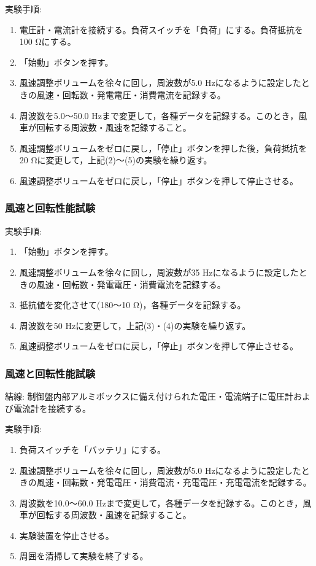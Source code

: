 \documentclass[a4paper,11pt,xelatex,ja=standard]{bxjsarticle}
\begin{document}
            実験手順:
            \begin{enumerate}
                \item 電圧計・電流計を接続する。負荷スイッチを「負荷」にする。負荷抵抗を100 Ωにする。
                \item 「始動」ボタンを押す。
                \item 風速調整ボリュームを徐々に回し，周波数が5.0 Hzになるように設定したときの風速・回転数・発電電圧・消費電流を記録する。
                \item 周波数を5.0～50.0 Hzまで変更して，各種データを記録する。このとき，風車が回転する周波数・風速を記録すること。
                \item 風速調整ボリュームをゼロに戻し，「停止」ボタンを押した後，負荷抵抗を20 Ωに変更して，上記(2)～(5)の実験を繰り返す。
                \item 風速調整ボリュームをゼロに戻し，「停止」ボタンを押して停止させる。
            \end{enumerate}
    
        \subsubsection{風速と回転性能試験}
            実験手順:
            \begin{enumerate}
                \item 「始動」ボタンを押す。
                \item 風速調整ボリュームを徐々に回し，周波数が35 Hzになるように設定したときの風速・回転数・発電電圧・消費電流を記録する。
                \item 抵抗値を変化させて(180～10 Ω)，各種データを記録する。
                \item 周波数を50 Hzに変更して，上記(3)・(4)の実験を繰り返す。
                \item 風速調整ボリュームをゼロに戻し，「停止」ボタンを押して停止させる。
            \end{enumerate}
    
        \subsubsection{風速と回転性能試験}
            結線: 制御盤内部アルミボックスに備え付けられた電圧・電流端子に電圧計および電流計を接続する。
    
            実験手順:
            \begin{enumerate}
                \item 負荷スイッチを「バッテリ」にする。
                \item 風速調整ボリュームを徐々に回し，周波数が5.0 Hzになるように設定したときの風速・回転数・発電電圧・消費電流・充電電圧・充電電流を記録する。
                \item 周波数を10.0～60.0 Hzまで変更して，各種データを記録する。このとき，風車が回転する周波数・風速を記録すること。
                \item 実験装置を停止させる。
                \item 周囲を清掃して実験を終了する。
            \end{enumerate}
\end{document}
